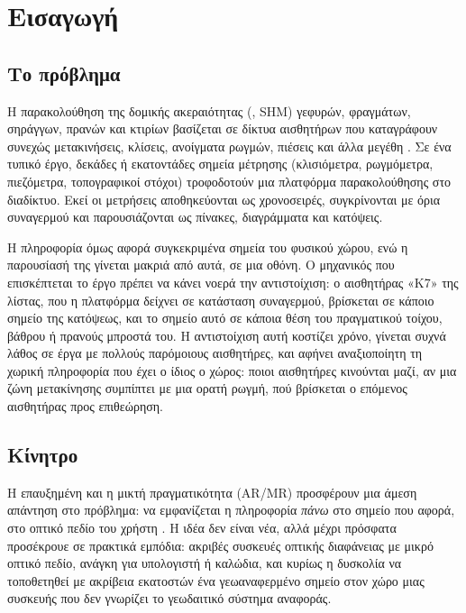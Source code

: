 \chapter{Εισαγωγή}
\label{ch:intro}

\section{Το πρόβλημα}
\label{sec:intro-problem}

Η παρακολούθηση της δομικής ακεραιότητας (, SHM) γεφυρών, φραγμάτων, σηράγγων, πρανών και κτιρίων βασίζεται σε δίκτυα αισθητήρων που καταγράφουν συνεχώς μετακινήσεις, κλίσεις, ανοίγματα ρωγμών, πιέσεις και άλλα μεγέθη \cite{farrar2007shm}. Σε ένα τυπικό έργο, δεκάδες ή εκατοντάδες σημεία μέτρησης (κλισιόμετρα, ρωγμόμετρα, πιεζόμετρα, τοπογραφικοί στόχοι) τροφοδοτούν μια πλατφόρμα παρακολούθησης στο διαδίκτυο. Εκεί οι μετρήσεις αποθηκεύονται ως χρονοσειρές, συγκρίνονται με όρια συναγερμού και παρουσιάζονται ως πίνακες, διαγράμματα και κατόψεις.

Η πληροφορία όμως αφορά συγκεκριμένα σημεία του φυσικού χώρου, ενώ η παρουσίασή της γίνεται μακριά από αυτά, σε μια οθόνη. Ο μηχανικός που επισκέπτεται το έργο πρέπει να κάνει νοερά την αντιστοίχιση: ο αισθητήρας «Κ7» της λίστας, που η πλατφόρμα δείχνει σε κατάσταση συναγερμού, βρίσκεται σε κάποιο σημείο της κατόψεως, και το σημείο αυτό σε κάποια θέση του πραγματικού τοίχου, βάθρου ή πρανούς μπροστά του. Η αντιστοίχιση αυτή κοστίζει χρόνο, γίνεται συχνά λάθος σε έργα με πολλούς παρόμοιους αισθητήρες, και αφήνει αναξιοποίητη τη χωρική πληροφορία που έχει ο ίδιος ο χώρος: ποιοι αισθητήρες κινούνται μαζί, αν μια ζώνη μετακίνησης συμπίπτει με μια ορατή ρωγμή, πού βρίσκεται ο επόμενος αισθητήρας προς επιθεώρηση.


\section{Κίνητρο}
\label{sec:intro-motivation}

Η επαυξημένη και η μικτή πραγματικότητα (AR/MR) προσφέρουν μια άμεση απάντηση στο πρόβλημα: να εμφανίζεται η πληροφορία \emph{πάνω} στο σημείο που αφορά, στο οπτικό πεδίο του χρήστη \cite{azuma1997survey,bressa2022situated}. Η ιδέα δεν είναι νέα, αλλά μέχρι πρόσφατα προσέκρουε σε πρακτικά εμπόδια: ακριβές συσκευές οπτικής διαφάνειας με μικρό οπτικό πεδίο, ανάγκη για υπολογιστή ή καλώδια, και κυρίως η δυσκολία να τοποθετηθεί με ακρίβεια εκατοστών ένα γεωαναφερμένο σημείο στον χώρο μιας συσκευής που δεν γνωρίζει το γεωδαιτικό σύστημα αναφοράς.

